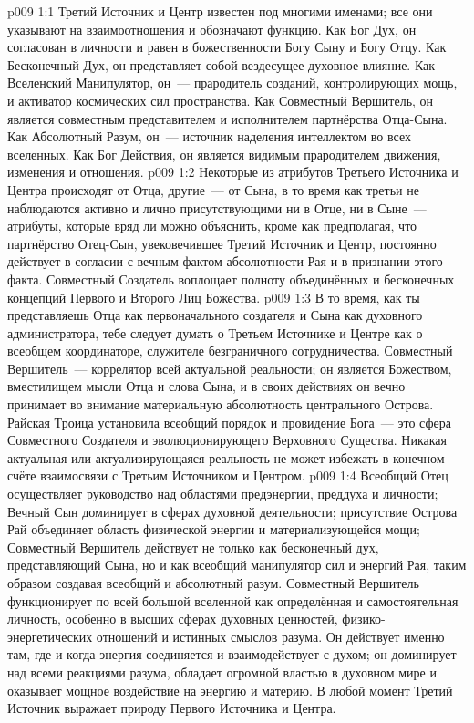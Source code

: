 \vs p009 1:1 Третий Источник и Центр известен под многими именами; все они указывают на взаимоотношения и обозначают функцию. Как Бог Дух, он согласован в личности и равен в божественности Богу Сыну и Богу Отцу. Как Бесконечный Дух, он представляет собой вездесущее духовное влияние. Как Вселенский Манипулятор, он~--- прародитель созданий, контролирующих мощь, и активатор космических сил пространства. Как Совместный Вершитель, он является совместным представителем и исполнителем партнёрства Отца\hyp{}Сына. Как Абсолютный Разум, он~--- источник наделения интеллектом во всех вселенных. Как Бог Действия, он является видимым прародителем движения, изменения и отношения.
\vs p009 1:2 Некоторые из атрибутов Третьего Источника и Центра происходят от Отца, другие~--- от Сына, в то время как третьи не наблюдаются активно и лично присутствующими ни в Отце, ни в Сыне~--- атрибуты, которые вряд ли можно объяснить, кроме как предполагая, что партнёрство Отец\hyp{}Сын, увековечившее Третий Источник и Центр, постоянно действует в согласии с вечным фактом абсолютности Рая и в признании этого факта. Совместный Создатель воплощает полноту объединённых и бесконечных концепций Первого и Второго Лиц Божества.
\vs p009 1:3 \pc В то время, как ты представляешь Отца как первоначального создателя и Сына как духовного администратора, тебе следует думать о Третьем Источнике и Центре как о всеобщем координаторе, служителе безграничного сотрудничества. Совместный Вершитель~--- коррелятор всей актуальной реальности; он является Божеством, вместилищем мысли Отца и слова Сына, и в своих действиях он вечно принимает во внимание материальную абсолютность центрального Острова. Райская Троица установила всеобщий порядок  и провидение Бога~--- это сфера Совместного Создателя и эволюционирующего Верховного Существа. Никакая актуальная или актуализирующаяся реальность не может избежать в конечном счёте взаимосвязи с Третьим Источником и Центром.
\vs p009 1:4 \pc Всеобщий Отец осуществляет руководство над областями предэнергии, преддуха и личности; Вечный Сын доминирует в сферах духовной деятельности; присутствие Острова Рай объединяет область физической энергии и материализующейся мощи; Совместный Вершитель действует не только как бесконечный дух, представляющий Сына, но и как всеобщий манипулятор сил и энергий Рая, таким образом создавая всеобщий и абсолютный разум. Совместный Вершитель функционирует по всей большой вселенной как определённая и самостоятельная личность, особенно в высших сферах духовных ценностей, физико\hyp{}энергетических отношений и истинных смыслов разума. Он действует именно там, где и когда энергия соединяется и взаимодействует с духом; он доминирует над всеми реакциями разума, обладает огромной властью в духовном мире и оказывает мощное воздействие на энергию и материю. В любой момент Третий Источник выражает природу Первого Источника и Центра.
